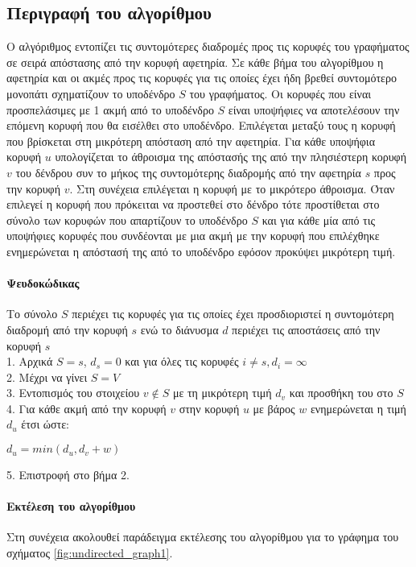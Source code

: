 \subsection{Περιγραφή του αλγορίθμου}
Ο αλγόριθμος εντοπίζει τις συντομότερες διαδρομές προς τις κορυφές του γραφήματος σε σειρά απόστασης από την κορυφή αφετηρία. Σε κάθε βήμα του αλγορίθμου η αφετηρία και οι ακμές προς τις κορυφές για τις οποίες έχει ήδη βρεθεί συντομότερο μονοπάτι σχηματίζουν το υποδένδρο $S$ του γραφήματος. Οι κορυφές που είναι προσπελάσιμες με 1 ακμή από το υποδένδρο $S$ είναι υποψήφιες να αποτελέσουν την επόμενη κορυφή που θα εισέλθει στο υποδένδρο. Επιλέγεται μεταξύ τους η κορυφή που βρίσκεται στη μικρότερη απόσταση από την αφετηρία. Για κάθε υποψήφια κορυφή $u$ υπολογίζεται το άθροισμα της απόστασής της από την πλησιέστερη κορυφή $v$ του δένδρου συν το μήκος της συντομότερης διαδρομής από την αφετηρία $s$ προς την κορυφή $v$. Στη συνέχεια επιλέγεται η κορυφή με το μικρότερο άθροισμα. Όταν επιλεγεί η κορυφή που πρόκειται να προστεθεί στο δένδρο τότε προστίθεται στο σύνολο των κορυφών που απαρτίζουν το υποδένδρο $S$  και για κάθε μία από τις υποψήφιες κορυφές που συνδέονται με μια ακμή με την κορυφή που επιλέχθηκε ενημερώνεται η απόστασή της από το υποδένδρο εφόσον προκύψει μικρότερη τιμή.

\paragraph{Ψευδοκώδικας}
Το σύνολο $S$ περιέχει τις κορυφές για τις οποίες έχει προσδιοριστεί η συντομότερη διαδρομή από την κορυφή $s$ ενώ το διάνυσμα $d$ περιέχει τις αποστάσεις από την κορυφή $s$ \\
1. Αρχικά $S={s}$, $d_s=0$ και για όλες τις κορυφές $i \neq s, d_i=\infty$ \\
2. Μέχρι να γίνει $S=V$ \\
3. Εντοπισμός του στοιχείου $v \notin S$ με τη μικρότερη τιμή $d_v$ και προσθήκη του στο $S$ \\
4. Για κάθε ακμή από την κορυφή $v$ στην κορυφή $u$ με βάρος $w$ ενημερώνεται η τιμή $d_u$ έτσι ώστε: \\
\centerline{$d_u=min(d_u, d_v+w)$}
5. Επιστροφή στο βήμα 2.

\paragraph{Εκτέλεση του αλγορίθμου}
Στη συνέχεια ακολουθεί παράδειγμα εκτέλεσης του αλγορίθμου για το γράφημα του σχήματος \ref{fig:undirected_graph1}.

